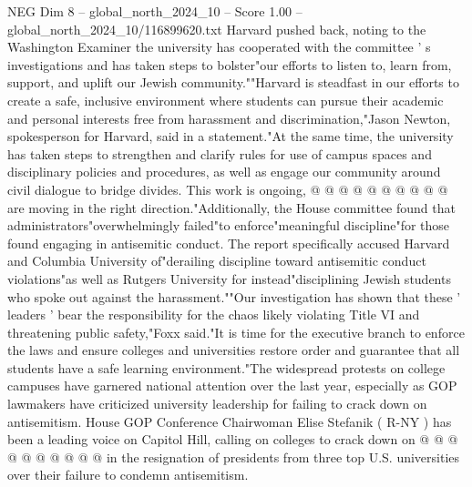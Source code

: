 \begin{textsample}{NEG Dim 8 – global\_north\_2024\_10 – Score 1.00 – global\_north\_2024\_10/116899620.txt}
Harvard pushed back, noting to the Washington Examiner the university has cooperated with the committee ' s investigations and has taken steps to bolster"our efforts to listen to, learn from, support, and uplift our Jewish community.""Harvard is steadfast in our efforts to create a safe, inclusive environment where students can pursue their academic and personal interests free from harassment and discrimination,"Jason Newton, spokesperson for Harvard, said in a statement."At the same time, the university has taken steps to strengthen and clarify rules for use of campus spaces and disciplinary policies and procedures, as well as engage our community around civil dialogue to bridge divides.
This work is ongoing, @ @ @ @ @ @ @ @ @ @ are moving in the right direction."Additionally, the House committee found that administrators"overwhelmingly failed"to enforce"meaningful discipline"for those found engaging in antisemitic conduct.
The report specifically accused Harvard and Columbia University of"derailing discipline toward antisemitic conduct violations"as well as Rutgers University for instead"disciplining Jewish students who spoke out against the harassment.""Our investigation has shown that these ' leaders ' bear the responsibility for the chaos likely violating Title VI and threatening public safety,"Foxx said."It is time for the executive branch to enforce the laws and ensure colleges and universities restore order and guarantee that all students have a safe learning environment."The widespread protests on college campuses have garnered national attention over the last year, especially as GOP lawmakers have criticized university leadership for failing to crack down on antisemitism.
House GOP Conference Chairwoman Elise Stefanik ( R-NY ) has been a leading voice on Capitol Hill, calling on colleges to crack down on @ @ @ @ @ @ @ @ @ @ in the resignation of presidents from three top U.S. universities over their failure to condemn antisemitism.

\end{textsample}
